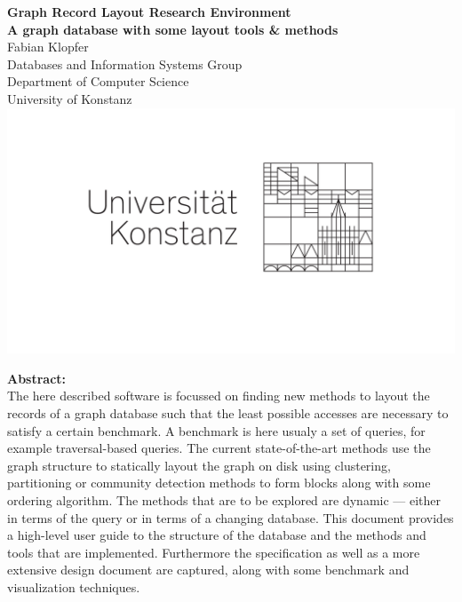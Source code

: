 \begin{titlepage}
\thispagestyle{plain}
   \begin{center}
       \vspace*{1cm}
        \Huge
       \textbf{Graph Record Layout Research Environment} \\
       \Large
       \textbf{A graph database with some layout tools \& methods} \\
       \vspace*{1cm}
       \normalsize
       Fabian Klopfer \vspace{1em}\\
       Databases and Information Systems Group \\
       Department of Computer Science \\
       University of Konstanz\\
       \includegraphics[keepaspectratio, height=0.3\textheight]{img/logo.pdf}
        \vspace*{1cm}
        
        \textbf{Abstract: \\}
        The here described software is focussed on finding new methods to layout the records of a graph database such that the least possible accesses are necessary to satisfy a certain benchmark. A benchmark is here usualy a set of queries, for example traversal-based queries. The current state-of-the-art methods use the graph structure to statically layout the graph on disk using clustering, partitioning or community detection methods to form blocks along with some ordering algorithm.
        The methods that are to be explored are dynamic --- either in terms of the query or in terms of a changing database.
        This document provides a high-level user guide to the structure of the database and the methods and tools that are implemented. Furthermore the specification as well as a more extensive design document are captured, along with some benchmark and visualization techniques.
   \end{center}
\end{titlepage}

\newpage
\tableofcontents
